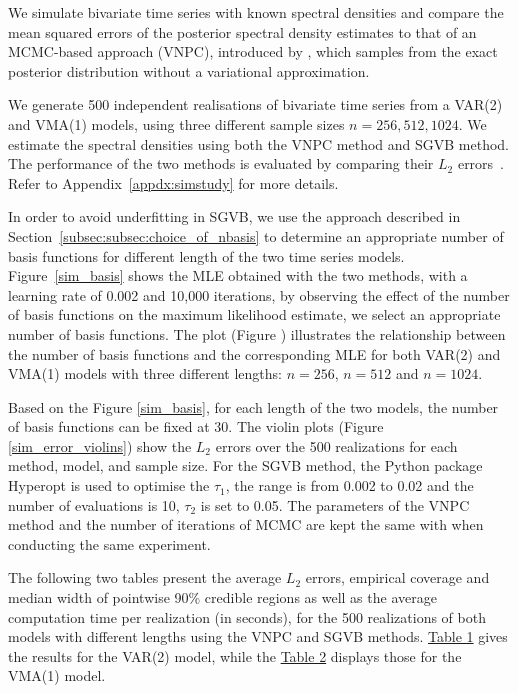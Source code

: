 \documentclass[%
 reprint,
 amsmath,amssymb,
 aps,
]{revtex4-2}
\begin{document}
We simulate bivariate time series with known spectral densities and compare the mean squared errors of the posterior spectral density estimates to that of an MCMC-based approach (VNPC), introduced by \citet{LiuYixuan2024Ancl}, which samples from the exact posterior distribution without a variational approximation. 

We generate 500 independent realisations of bivariate time series from a VAR(2) and VMA(1) models, using three  different sample sizes $n=256,512,1024$. 
We estimate the spectral densities using both the VNPC method and SGVB method. 
The performance of the two methods is evaluated by comparing their 
$L_2$ errors~\citeme. 
Refer to Appendix~\ref{appdx:simstudy} for more details.

In order to avoid underfitting in SGVB, we use the approach described in Section~\ref{subsec:subsec:choice_of_nbasis} to determine an appropriate number of basis functions for different length of the two time series models. 
Figure~\ref{sim_basis} shows the MLE obtained with the two methods, with a learning rate of 0.002 and 10,000 iterations, by observing the effect of the number of basis functions on the maximum likelihood estimate, we select an appropriate number of basis functions. The plot (Figure ) illustrates the relationship between the number of basis functions and the corresponding MLE for both VAR(2) and VMA(1) models with three different lengths: $n=256$, $n=512$ and $n=1024$.


Based on the Figure \ref{sim_basis}, for each length of the two models, the number of basis functions can be fixed at 30. The violin plots (Figure \ref{sim_error_violins}) show the $L_2$ errors over the 500 realizations for each method, model, and sample size. For the SGVB method, the Python package Hyperopt is used to optimise the $\tau_1$, the range is from 0.002 to 0.02 and the number of evaluations is 10, $\tau_2$ is set to 0.05.
The parameters of the VNPC method and the number of iterations of MCMC are kept the same with \cite{LiuYixuan2024Ancl}  when conducting the same experiment.


The following two tables present the average  $L_2$ errors, empirical coverage and median width of pointwise 90\% credible regions as well as the average computation time per realization (in seconds), for the 500 realizations of both models with different lengths using the VNPC and SGVB methods. \hyperref[table l1l2 var2]{Table 1} gives the results for  the VAR(2) model, while the \hyperref[table l1l2 vma1]{Table 2} displays those for  the VMA(1) model.
\end{document}
